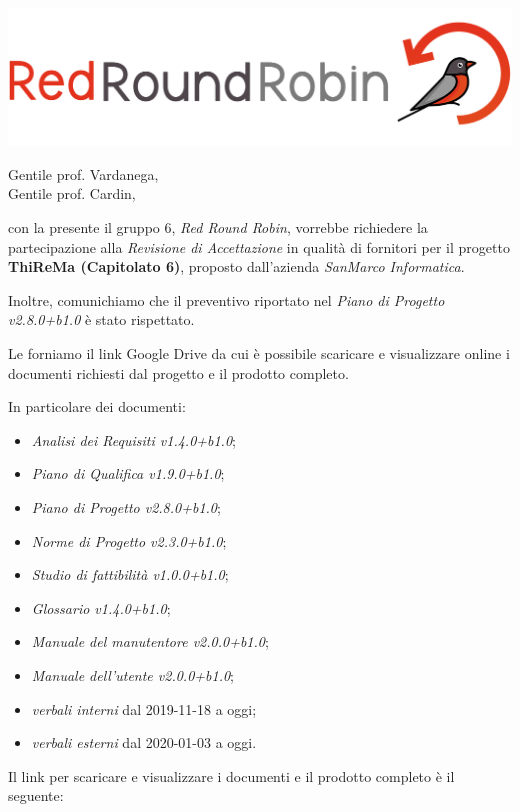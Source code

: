 \documentclass[12pt]{letter}
\date{15 maggio 2020}
\begin{document}
\begin{letter}{ }

\includegraphics[scale=0.17]{images/logo.png}

\opening{Gentile prof. Vardanega,\\ Gentile prof. Cardin, }

con la presente il gruppo 6, \textit{Red Round Robin}, vorrebbe richiedere la partecipazione alla \textit{Revisione di Accettazione} in qualità di fornitori per il progetto \textbf{ThiReMa (Capitolato 6)}, proposto dall'azienda \textit{SanMarco Informatica}.

Inoltre, comunichiamo che il preventivo riportato nel \textit{Piano di Progetto v2.8.0+b1.0} è stato rispettato.

Le forniamo il link Google Drive da cui è possibile scaricare e visualizzare online i documenti richiesti dal progetto e il prodotto completo.

In particolare dei documenti:

\begin{itemize}
  	\item \textit{Analisi dei Requisiti v1.4.0+b1.0};
	\item \textit{Piano di Qualifica v1.9.0+b1.0};
	\item \textit{Piano di Progetto v2.8.0+b1.0};
	\item \textit{Norme di Progetto v2.3.0+b1.0};
	\item \textit{Studio di fattibilità v1.0.0+b1.0};
	\item \textit{Glossario v1.4.0+b1.0};
	\item \textit{Manuale del manutentore v2.0.0+b1.0};
	\item \textit{Manuale dell'utente v2.0.0+b1.0};
	\item \textit{verbali interni} dal 2019-11-18 a oggi;
	\item \textit{verbali esterni} dal 2020-01-03 a oggi.	
\end{itemize}

Il link per scaricare e visualizzare i documenti e il prodotto completo è il seguente:


\end{letter}
\end{document}
